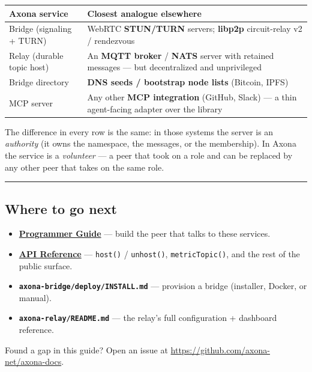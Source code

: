 \documentclass[
  nobib]{tufte-handout}
\newcounter{none} %
\providecommand{\tightlist}{%
  \setlength{\itemsep}{0pt}\setlength{\parskip}{0pt}}
\begin{document}
{\def\LTcaptype{none} %
\begin{longtable}[]{@{}
  >{\raggedright\arraybackslash}p{}
  >{\raggedright\arraybackslash}p{}@{}}
\toprule\noalign{}
\begin{minipage}[b]{\linewidth}\raggedright
Axona service
\end{minipage} & \begin{minipage}[b]{\linewidth}\raggedright
Closest analogue elsewhere
\end{minipage} \\
\midrule\noalign{}
\endhead
\bottomrule\noalign{}
\endlastfoot
Bridge (signaling + TURN) & WebRTC \textbf{STUN/TURN} servers;
\textbf{libp2p} circuit-relay v2 / rendezvous \\
Relay (durable topic host) & An \textbf{MQTT broker} / \textbf{NATS}
server with retained messages --- but decentralized and unprivileged \\
Bridge directory & \textbf{DNS seeds / bootstrap node lists} (Bitcoin,
IPFS) \\
MCP server & Any other \textbf{MCP integration} (GitHub, Slack) --- a
thin agent-facing adapter over the library \\
\end{longtable}
}

The difference in every row is the same: in those systems the server is
an \emph{authority} (it owns the namespace, the messages, or the
membership). In Axona the service is a \emph{volunteer} --- a peer that
took on a role and can be replaced by any other peer that takes on the
same role.

\begin{center}\rule{0.5\linewidth}{0.5pt}\end{center}

\subsection{Where to go next}\label{where-to-go-next}

\begin{itemize}
\tightlist
\item
  \textbf{\href{Axona-Programmer-Guide-v4.11.2.md}{Programmer Guide}}
  --- build the peer that talks to these services.
\item
  \textbf{\href{Axona-API-Reference-v4.11.2.md}{API Reference}} ---
  \texttt{host()} / \texttt{unhost()}, \texttt{metricTopic()}, and the
  rest of the public surface.
\item
  \textbf{\texttt{axona-bridge/deploy/INSTALL.md}} --- provision a
  bridge (installer, Docker, or manual).
\item
  \textbf{\texttt{axona-relay/README.md}} --- the relay's full
  configuration + dashboard reference.
\end{itemize}

Found a gap in this guide? Open an issue at
\url{https://github.com/axona-net/axona-docs}.
\end{document}
